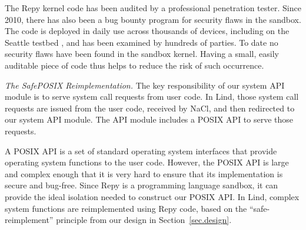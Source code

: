 

The Repy kernel code has been
audited by a professional penetration tester.  Since 2010, there has also been
a bug bounty program for security flaws in the sandbox.
The code is deployed in daily use across thousands of devices,
including on the Seattle testbed \cite{seattle}, and has been examined by
hundreds of parties.  
To date no security flaws have been found in the sandbox kernel.
Having a small, easily auditable piece of code thus helps to reduce the
risk of such occurrence.

\textit{The SafePOSIX Reimplementation.}
The key responsibility of our system API module is to serve system call requests from user code.
In Lind, those system call requests are issued from the user code,
received by NaCl, and then redirected to our system API module.
The API module includes a POSIX API to serve those requests.

A POSIX API is a set of standard operating system interfaces that provide operating system functions
to the user code. However, the POSIX API is large and complex enough that it is
very hard to ensure that its implementation is secure and bug-free.
%
Since Repy is a programming language sandbox, it can provide the ideal isolation
needed to construct our POSIX API. In Lind,
complex system functions are reimplemented using Repy code,
based on the ``safe-reimplement'' principle from our design in Section~{\ref{sec.design}}.

